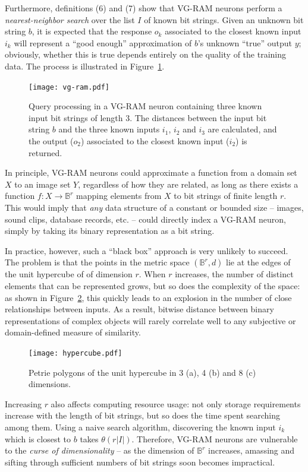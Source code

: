 \documentclass[twocolumn, 9pt]{jsproceedings}
\begin{document}
Furthermore, definitions (6) and (7) show that VG-RAM neurons perform a {\it nearest-neighbor search} over the list \(I\) of known bit strings. Given an unknown bit string \(b\), it is expected that the response \(o_k\) associated to the closest known input \(i_k\) will represent a ``good enough'' approximation of \(b\)'s unknown ``true'' output \(y\); obviously, whether this is true depends entirely on the quality of the training data. The process is illustrated in Figure~\ref{fig:vg-ram}.

\begin{figure}[h!]
\texttt{[image: vg-ram.pdf]}
\caption{Query processing in a VG-RAM neuron containing three known input bit strings of length \(3\). The distances between the input bit string \(b\) and the three known inputs \(i_1\), \(i_2\) and \(i_3\) are calculated, and the output (\(o_2\)) associated to the closest known input (\(i_2\)) is returned.}
\label{fig:vg-ram}
\end{figure}

In principle, VG-RAM neurons could approximate a function from a domain set \(X\) to an image set \(Y\), regardless of how they are related, as long as there exists a function \(f : X \to \mathbb{B}^r \) mapping elements from \(X\) to bit strings of finite length \(r\). This would imply that {\it any} data structure of a constant or bounded size -- images, sound clips, database records, etc. -- could directly index a VG-RAM neuron, simply by taking its binary representation as a bit string.

In practice, however, such a ``black box'' approach is very unlikely to succeed. The problem is that the points in the metric space \((\mathbb{B}^r , d)\) lie at the edges of the unit hypercube of of dimension \(r\). When \(r\) increases, the number of distinct elements that can be represented grows, but so does the complexity of the space: as shown in Figure~\ref{fig:hypercube}, this quickly leads to an explosion in the number of close relationships between inputs. As a result, bitwise distance between binary representations of complex objects will rarely correlate well to any subjective or domain-defined measure of similarity.

\begin{figure}[h!]
\texttt{[image: hypercube.pdf]}
\caption{Petrie polygons of the unit hypercube in 3 (a), 4 (b) and 8 (c) dimensions.}
\label{fig:hypercube}
\end{figure}

Increasing \(r\) also affects computing resource usage: not only storage requirements increase with the length of bit strings, but so does the time spent searching among them. Using a naive search algorithm, discovering the known input \(i_k\) which is closest to \(b\) takes \(\theta(r|I|)\). Therefore, VG-RAM neurons are vulnerable to the {\it curse of dimensionality} -- as the dimension of \(\mathbb{B}^r\) increases,  amassing and sifting through sufficient numbers of bit strings soon becomes impractical.
\end{document}
